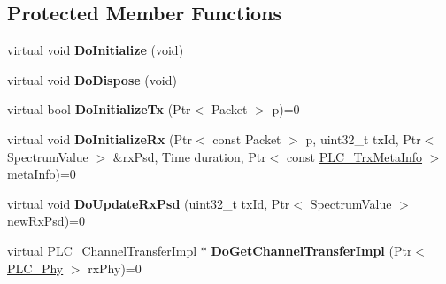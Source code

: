 \subsection*{\-Protected \-Member \-Functions}
\begin{DoxyCompactItemize}
\item 
\hypertarget{classns3_1_1PLC__Phy_a614fcc21473fed15ea0a56f86a0e3628}{virtual void {\bfseries \-Do\-Initialize} (void)}\label{classns3_1_1PLC__Phy_a614fcc21473fed15ea0a56f86a0e3628}

\item 
\hypertarget{classns3_1_1PLC__Phy_a5654398d73868f256bd338a5bd64229f}{virtual void {\bfseries \-Do\-Dispose} (void)}\label{classns3_1_1PLC__Phy_a5654398d73868f256bd338a5bd64229f}

\item 
\hypertarget{classns3_1_1PLC__Phy_a29adea495ce0dfd3299766982ed5b0fe}{virtual bool {\bfseries \-Do\-Initialize\-Tx} (\-Ptr$<$ \-Packet $>$ p)=0}\label{classns3_1_1PLC__Phy_a29adea495ce0dfd3299766982ed5b0fe}

\item 
\hypertarget{classns3_1_1PLC__Phy_a46b98bd3de07f51cfa53af58fa20f1cd}{virtual void {\bfseries \-Do\-Initialize\-Rx} (\-Ptr$<$ const \-Packet $>$ p, uint32\-\_\-t tx\-Id, \-Ptr$<$ \-Spectrum\-Value $>$ \&rx\-Psd, \-Time duration, \-Ptr$<$ const \hyperlink{classns3_1_1PLC__TrxMetaInfo}{\-P\-L\-C\-\_\-\-Trx\-Meta\-Info} $>$ meta\-Info)=0}\label{classns3_1_1PLC__Phy_a46b98bd3de07f51cfa53af58fa20f1cd}

\item 
\hypertarget{classns3_1_1PLC__Phy_ad2137025b97803e834683d9a1eed897e}{virtual void {\bfseries \-Do\-Update\-Rx\-Psd} (uint32\-\_\-t tx\-Id, \-Ptr$<$ \-Spectrum\-Value $>$ new\-Rx\-Psd)=0}\label{classns3_1_1PLC__Phy_ad2137025b97803e834683d9a1eed897e}

\item 
\hypertarget{classns3_1_1PLC__Phy_ac539a2e014f1ed6a532ee79e7e4f1ea0}{virtual \hyperlink{classns3_1_1PLC__ChannelTransferImpl}{\-P\-L\-C\-\_\-\-Channel\-Transfer\-Impl} $\ast$ {\bfseries \-Do\-Get\-Channel\-Transfer\-Impl} (\-Ptr$<$ \hyperlink{classns3_1_1PLC__Phy}{\-P\-L\-C\-\_\-\-Phy} $>$ rx\-Phy)=0}\label{classns3_1_1PLC__Phy_ac539a2e014f1ed6a532ee79e7e4f1ea0}

\end{DoxyCompactItemize}
